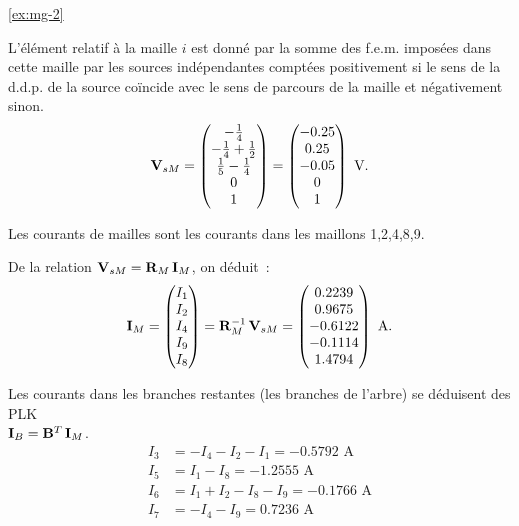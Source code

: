 \begin{solexercise}{\ref{ex:mg-2}}

L'élément
relatif à la maille $i$ est donné par la somme des f.e.m.  imposées
dans cette maille par les sources indépendantes comptées positivement si le
sens de la d.d.p. de la source coïncide avec le sens de parcours de la
maille  et négativement sinon.
\[{\bf V}_{sM}=
\begin{pmatrix}
-\frac{1}{4}\\
-\frac{1}{4}+\frac{1}{2}\\
\frac{1}{5}-\frac{1}{4}\\
0\\
1
\end{pmatrix} =
\begin{pmatrix}
-0.25 \\ 0.25 \\ -0.05 \\ 0 \\ 1
\end{pmatrix}\text{~V.}
\]

Les courants de mailles sont les courants dans les maillons
1,2,4,8,9.


De la relation ${\bf V}_{sM}={\bf R}_M\, {\bf I}_M$, on déduit~:
\[{\bf I}_M=\begin{pmatrix}
I_1\\ I_2\\I_4\\I_9\\I_8
\end{pmatrix}= {\bf R}_M^{-1}\, {\bf V}_{sM}=
\begin{pmatrix}
0.2239\\ 0.9675\\-0.6122\\-0.1114\\1.4794
\end{pmatrix}\text{~A.}\]


Les courants dans les branches restantes (les branches de l'arbre) se
déduisent des PLK \\${\bf I}_B={\bf B}^T\, {\bf I}_M$.
\begin{align*}
I_3 & = -I_4-I_2-I_1=-0.5792 \text{~A}\\
I_5 & = I_1-I_8=-1.2555 \text{~A}\\
I_6 & = I_1+I_2-I_8-I_9=-0.1766 \text{~A}\\
I_7 & = -I_4-I_9= 0.7236 \text{~A}
\end{align*}


\end{solexercise}
